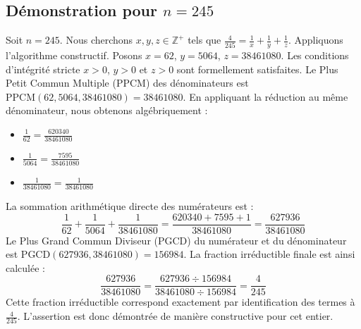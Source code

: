 \documentclass[11pt,a4paper]{article}
\begin{document}
\subsection{Démonstration pour $n = 245$}
Soit $n = 245$. Nous cherchons $x, y, z \in \mathbb{Z}^{+}$ tels que $\frac{4}{245} = \frac{1}{x} + \frac{1}{y} + \frac{1}{z}$.
Appliquons l'algorithme constructif. Posons $x = 62$, $y = 5064$, $z = 38461080$.
Les conditions d'intégrité stricte $x > 0$, $y > 0$ et $z > 0$ sont formellement satisfaites.
Le Plus Petit Commun Multiple (PPCM) des dénominateurs est $\text{PPCM}(62, 5064, 38461080) = 38461080$.
En appliquant la réduction au même dénominateur, nous obtenons algébriquement :
\begin{itemize}
    \item $\frac{1}{62} = \frac{620340}{38461080}$
    \item $\frac{1}{5064} = \frac{7595}{38461080}$
    \item $\frac{1}{38461080} = \frac{1}{38461080}$
\end{itemize}
La sommation arithmétique directe des numérateurs est :
$$ \frac{1}{62} + \frac{1}{5064} + \frac{1}{38461080} = \frac{620340 + 7595 + 1}{38461080} = \frac{627936}{38461080} $$
Le Plus Grand Commun Diviseur (PGCD) du numérateur et du dénominateur est $\text{PGCD}(627936, 38461080) = 156984$.
La fraction irréductible finale est ainsi calculée :
$$ \frac{627936}{38461080} = \frac{627936 \div 156984}{38461080 \div 156984} = \frac{4}{245} $$
Cette fraction irréductible correspond exactement par identification des termes à $\frac{4}{245}$. L'assertion est donc démontrée de manière constructive pour cet entier.
\end{document}
